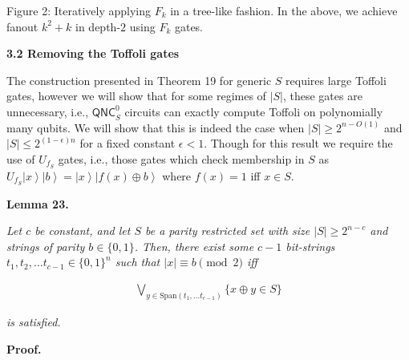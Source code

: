\documentclass[10pt,a4paper]{article}
\begin{document}
Figure 2: Iteratively applying $F_{k}$ in a tree-like fashion. In the above, we achieve fanout $k^{2}+k$ in depth-$2$ using $F_{k}$ gates.





\par\medskip\noindent\textbf{
3.2 Removing the Toffoli gates}\par




The construction presented in Theorem 19 for generic $S$ requires large Toffoli gates, however we will show that for some regimes of $|S|$, these gates are unnecessary, i.e., ${\mathsf{QNC}}^{0}_{S}$ circuits can exactly compute Toffoli on polynomially many qubits. We will show that this is indeed the case when $|S|\geq 2^{n-O(1)}$ and $|S|\leq 2^{(1-\epsilon)n}$ for a fixed constant $\epsilon<1$. Though for this result we require the use of $U_{f_{S}}$ gates, i.e., those gates which check membership in $S$ as $U_{f_{S}}\left|x\right\rangle\left|b\right\rangle=\left|x\right\rangle\left|f(x)\oplus b\right\rangle$ where $f(x)=1$ iff $x\in S$.\par





\par\medskip\noindent\textbf{
\textbf{Lemma 23}\textbf{.}
}\par



\emph{Let $c$ be constant, and let $S$ be a parity restricted set with size $|S|\geq 2^{n-c}$ and strings of parity $b\in\{0,1\}$. Then, there exist some $c-1$ bit-strings $t_{1},t_{2},\dots t_{c-1}\in\{0,1\}^{n}$ such that $|x|\equiv b\pmod{2}$ iff}\par


\[\begin{gathered}
\displaystyle\bigvee_{y\in\mathrm{Span}(t_{1},\dots t_{c-1})}\{x\oplus y\in S\}
\end{gathered}\]


\emph{is satisfied.}\par






\par\medskip\noindent\textbf{Proof.}\par
\end{document}

